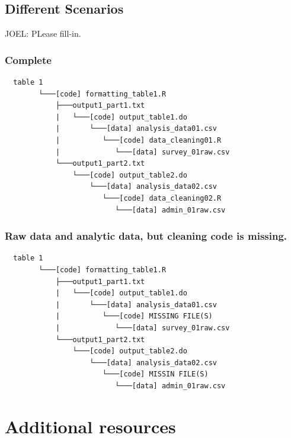 \documentclass[]{book}
\begin{document}
\hypertarget{different-scenarios}{%
\section{Different Scenarios}\label{different-scenarios}}

JOEL: PLease fill-in.

\hypertarget{complete}{%
\subsection{Complete}\label{complete}}

\begin{verbatim}
  table 1
        └───[code] formatting_table1.R
            ├───output1_part1.txt  
            |   └───[code] output_table1.do           
            |       └───[data] analysis_data01.csv
            |          └───[code] data_cleaning01.R
            |             └───[data] survey_01raw.csv
            └───output1_part2.txt  
                └───[code] output_table2.do           
                    └───[data] analysis_data02.csv
                       └───[code] data_cleaning02.R
                          └───[data] admin_01raw.csv  
\end{verbatim}

\hypertarget{raw-data-and-analytic-data-but-cleaning-code-is-missing.}{%
\subsection{Raw data and analytic data, but cleaning code is missing.}\label{raw-data-and-analytic-data-but-cleaning-code-is-missing.}}

\begin{verbatim}
  table 1
        └───[code] formatting_table1.R
            ├───output1_part1.txt  
            |   └───[code] output_table1.do           
            |       └───[data] analysis_data01.csv
            |          └───[code] MISSING FILE(S)
            |             └───[data] survey_01raw.csv
            └───output1_part2.txt  
                └───[code] output_table2.do           
                    └───[data] analysis_data02.csv
                       └───[code] MISSIN FILE(S)
                          └───[data] admin_01raw.csv  
\end{verbatim}

\hypertarget{additional-resources}{%
\chapter{Additional resources}\label{additional-resources}}
\end{document}
